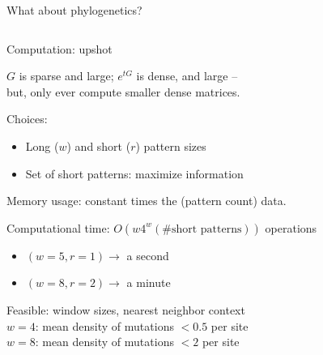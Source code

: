 \documentclass[smaller]{beamer}
\begin{document}
\begin{frame}{What about phylogenetics?}
\begin{columns}[c]
\begin{column}{.5\textwidth}
    \end{column}
  \end{columns}

\end{frame}

\begin{frame}{Computation: upshot}

  $G$ is sparse and large; $e^{tG}$ is dense, and large -- \\
  \hspace{3em} but, only ever compute smaller dense matrices.

  \vspace{1em}

  {\struct Choices:}
  \begin{itemize}
    \item Long ($w$) and short ($r$) pattern sizes
    \item Set of short patterns: maximize information
  \end{itemize}

  \vspace{1em}

  {\struct Memory usage:} constant times the (pattern count) data.

  \vspace{1em}

  {\struct Computational time:} $O(w 4^{w} (\#\text{short patterns}))$ operations 
  \begin{itemize}
    \item $(w=5,r=1) \longrightarrow$  a second
    \item $(w=8,r=2) \longrightarrow$  a minute
  \end{itemize}

  \vspace{1em}

  {\struct Feasible:} window sizes, nearest neighbor context \\
  \hspace{3em} $w=4$: mean density of mutations ${} < 0.5$ per site\\
  \hspace{3em}   $w=8$: mean density of mutations ${} < 2$ per site

\end{frame}
\end{document}
